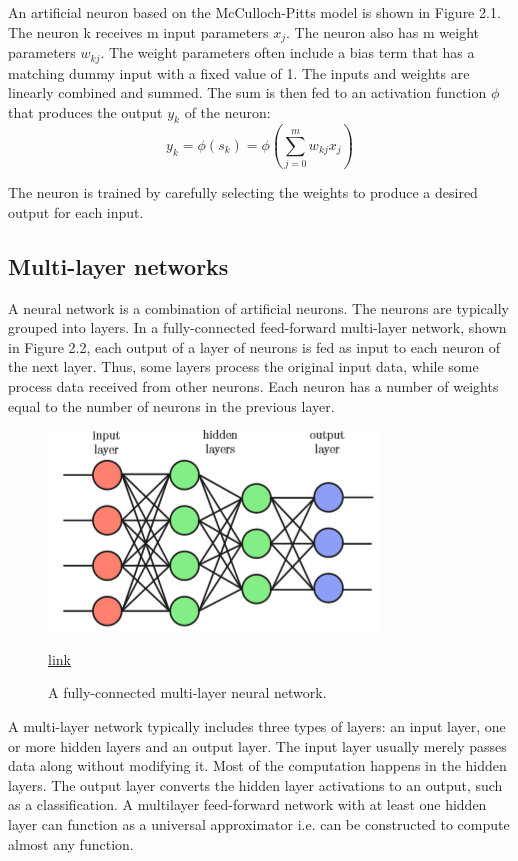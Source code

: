 An artificial neuron based on the McCulloch-Pitts model is shown in Figure 2.1. The neuron k receives m input parameters $x_{j}$. The neuron also has m weight parameters $w_{kj}$. The weight parameters often include a bias term that has a matching dummy input with a fixed value of 1. The inputs and weights are linearly combined and summed. The sum is then fed to an activation function $\phi$ that produces the output $y_{k}$ of the neuron:\[y_{k} = \phi(s_{k}) = \phi( \sum_{j=0}^{m}w_{kj}x_{j}) \]

The neuron is trained by carefully selecting the weights to produce a desired output for each input.


\subsection{Multi-layer networks}
A neural network is a combination of artificial neurons. The neurons are typically grouped into layers. In a fully-connected feed-forward multi-layer network, shown in Figure 2.2, each output of a layer of neurons is fed as input to each neuron of the next layer. Thus, some layers process the original input data, while some process data received from other neurons. Each neuron has a number of weights equal to the number of neurons in the previous layer.
\begin{figure}
	\centering
	\includegraphics[width=0.7\linewidth]{img2}
	\caption{A fully-connected multi-layer neural network.} \href{https://www.semanticscholar.org/paper/Object-detection-from-images-using-convolutional-Stenroos/a6ee78ea9c68d99d6545227fed925a721337bb16/figure/1}{link}
	\label{fig:img2}
\end{figure}

A multi-layer network typically includes three types of layers: an input layer, one or more hidden layers and an output layer. The input layer usually merely passes data along without modifying it. Most of the computation happens in the hidden layers. The output layer converts the hidden layer activations to an output, such as a classification. A multilayer feed-forward network with at least one hidden layer can function as a universal approximator i.e. can be constructed to compute almost any function.

